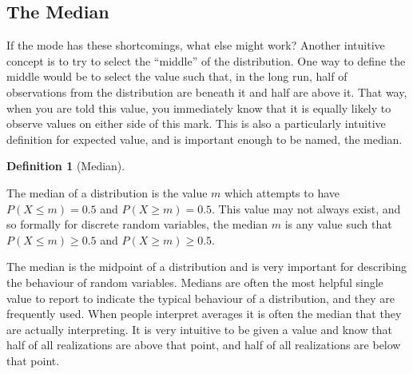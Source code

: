 \documentclass[
  letterpaper,
  DIV=11,
  numbers=noendperiod]{scrreprt}
\theoremstyle{definition}
\theoremstyle{definition}
\theoremstyle{definition}
\newtheorem{definition}{Definition}[chapter]
\theoremstyle{remark}
\begin{document}
\subsection{The Median}\label{the-median}

If the mode has these shortcomings, what else might work? Another
intuitive concept is to try to select the ``middle'' of the
distribution. One way to define the middle would be to select the value
such that, in the long run, half of observations from the distribution
are beneath it and half are above it. That way, when you are told this
value, you immediately know that it is equally likely to observe values
on either side of this mark. This is also a particularly intuitive
definition for expected value, and is important enough to be named, the
median.

\begin{definition}[Median]\protect\hypertarget{def-median}{}\label{def-median}

The median of a distribution is the value \(m\) which attempts to have
\(P(X \leq m) = 0.5\) and \(P(X \geq m) = 0.5\). This value may not
always exist, and so formally for discrete random variables, the median
\(m\) is any value such that \(P(X \leq m) \geq 0.5\) and
\(P(X \geq m) \geq 0.5\).

\end{definition}

The median is the midpoint of a distribution and is very important for
describing the behaviour of random variables. Medians are often the most
helpful single value to report to indicate the typical behaviour of a
distribution, and they are frequently used. When people interpret
averages it is often the median that they are actually interpreting. It
is very intuitive to be given a value and know that half of all
realizations are above that point, and half of all realizations are
below that point.
\end{document}
